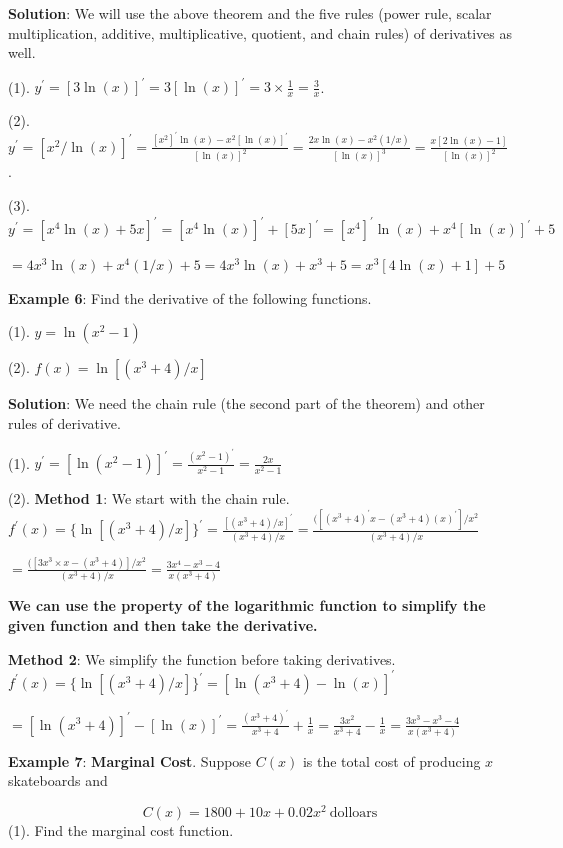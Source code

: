 \documentclass[
]{book}
\begin{document}
\textbf{Solution}: We will use the above theorem and the five rules (power rule, scalar multiplication, additive, multiplicative, quotient, and chain rules) of derivatives as well.

(1). \(y^\prime = [3\ln (x)]^\prime = 3[\ln (x)]^\prime = 3\times \frac{1}{x} = \frac{3}{x}\).

(2). \(y^\prime = [x^2/\ln (x)]^\prime = \frac{[x^2]^\prime \ln(x) - x^2[\ln(x)]^\prime}{[\ln(x)]^2} = \frac{2x\ln(x)-x^2(1/x)}{[\ln(x)]^3} = \frac{x[2\ln(x)-1]}{[\ln(x)]^2}\).

(3). \(y^\prime = [x^4\ln(x) + 5x]^\prime = [x^4\ln(x)]^\prime + [5x]^\prime = [x^4]^\prime\ln(x) + x^4[\ln(x)]^\prime + 5\)

\(= 4x^3\ln(x) + x^4(1/x) + 5 = 4x^3\ln(x) + x^3 + 5 = x^3[4\ln(x)+1]+ 5\)

\hfill\break

\textbf{Example 6}: Find the derivative of the following functions.

(1). \(y = \ln(x^2-1)\)

(2). \(f(x) = \ln[(x^3 + 4)/x]\)

\textbf{Solution}: We need the chain rule (the second part of the theorem) and other rules of derivative.

(1). \(y^\prime = [\ln(x^2-1)]^\prime = \frac{(x^2-1)^\prime}{x^2-1} = \frac{2x}{x^2-1}\)

(2). \textbf{Method 1}: We start with the chain rule. \(f^\prime(x)= \{\ln[(x^3 + 4)/x]\}^\prime = \frac{[(x^3 + 4)/x]^\prime}{(x^3 + 4)/x} = \frac{([(x^3 + 4)^\prime x- (x^3+4)(x)^\prime]/x^2}{(x^3 + 4)/x}\)

\(= \frac{([3x^3\times x- (x^3+4)]/x^2}{(x^3 + 4)/x} = \frac{3x^4- x^3-4}{x(x^3 + 4)}\)

\textbf{\color{red}We can use the property of the logarithmic function to simplify the given function and then take the derivative.}

\textbf{Method 2}: We simplify the function before taking derivatives. \(f^\prime(x)= \{\ln[(x^3 + 4)/x]\}^\prime = [\ln(x^3 + 4) - \ln(x)]^\prime\)

\(= [\ln(x^3+4)]^\prime -[\ln(x)]^\prime= \frac{(x^3+4)^\prime}{x^3+4} +\frac{1}{x} = \frac{3x^2}{x^3+4} - \frac{1}{x} = \frac{3x^3-x^3-4}{x(x^3+4)}\)

\hfill\break

\textbf{Example 7}: \textbf{Marginal Cost}. Suppose \(C(x)\) is the total cost of producing \(x\) skateboards and

\[
C(x) = 1800 + 10x + 0.02x^2 \ \text{dolloars}
\]
(1). Find the marginal cost function.
\end{document}
